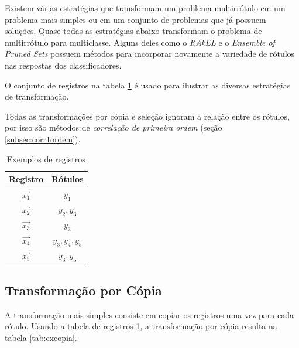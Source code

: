 \documentclass[runningheads,a4paper]{llncs}
\begin{document}
Existem várias estratégias que transformam um problema multirrótulo em um problema mais simples ou em um conjunto de problemas que já possuem soluções. Quase todas as estratégias abaixo transformam o problema de multirrótulo para multiclasse. Alguns deles como o \textit{RAkEL} \cite{Tsoumakas2007-wm} e o \textit{Ensemble of Pruned Sets} \cite{Read2008-bt} possuem métodos para incorporar novamente a variedade de rótulos nas respostas dos classificadores.

O conjunto de registros na tabela \ref{tab:exbase} é usado para ilustrar as diversas estratégias de transformação.

Todas as transformações por cópia e seleção ignoram a relação entre os rótulos, por isso são métodos de \textit{correlação de primeira ordem} (seção \ref{subsec:corr1ordem}).

\begin{table}
	\centering
	\begin{tabular}{| c | c |}
		\hline
		\textbf{Registro} & \textbf{Rótulos} \\
		\hline
		$\vec{x_1}$ & $y_1$ \\
		\hline
		$\vec{x_2}$ & $y_2, y_3$ \\
		\hline
		$\vec{x_3}$ & $y_3$ \\
		\hline
		$\vec{x_4}$ & $y_3, y_4, y_5$ \\
		\hline
		$\vec{x_5}$ & $y_3, y_5$ \\
		\hline
	\end{tabular}
	\caption{Exemplos de registros}
	\label{tab:exbase}
\end{table}

\subsection{Transformação por Cópia} \label{subsec:copia}

A transformação mais simples consiste em copiar os registros uma vez para cada rótulo. Usando a tabela de registros \ref{tab:exbase}, a transformação por cópia resulta na tabela \ref{tab:excopia}.
\end{document}
